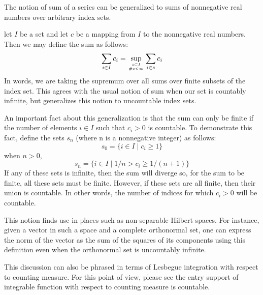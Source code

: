 \documentclass[12pt]{article}
\begin{document}
The notion of sum of a series can be generalized to sums of nonnegative
real numbers over arbitrary index sets.

let $I$ be a set and let $c$ be a mapping from $I$ to the nonnegative
real numbers.  Then we may define the sum as follows:
 \[\sum_{i \in I} c_i = \sup_{s \subset I \atop \#s < \infty} \sum_{i
 \in s} c_i\]
In words, we are taking the supremum over all sums over finite subsets
of the index set.  This agrees with the usual notion of sum when our
set is countably infinite, but generalizes this notion to uncountable
index sets.

An important fact about this generalization is that the sum can only
be finite if the number of elements $i \in I$ such that $c_i > 0$ is
countable.  To demonstrate this fact, define the sets $s_n$ (where n
is a nonnegative integer) as follows:
 \[ s_0 = \{ i \in I \mid c_i \ge 1 \}\]
when $n>0$,
 \[ s_n = \{ i \in I \mid 1/n > c_i \ge 1/(n+1) \}\]
If any of these sets is infinite, then the sum will diverge so, for
the sum to be finite, all these sets must be finite.  However, if
these sets are all finite, then their union is countable.  In other
words, the number of indices for which $c_i > 0$ will be countable.

This notion finds use in places such as non-separable Hilbert spaces.
For instance, given a vector in such a space and a complete
orthonormal set, one can express the norm of the vector as the sum of
the squares of its components using this definition even when the
orthonormal set is uncountably infinite.

This discussion can also be phrased in terms of Lesbegue integration 
with respect to counting measure.  For this point of view, please see the entry
support of integrable function with respect to counting measure is countable.
\end{document}
